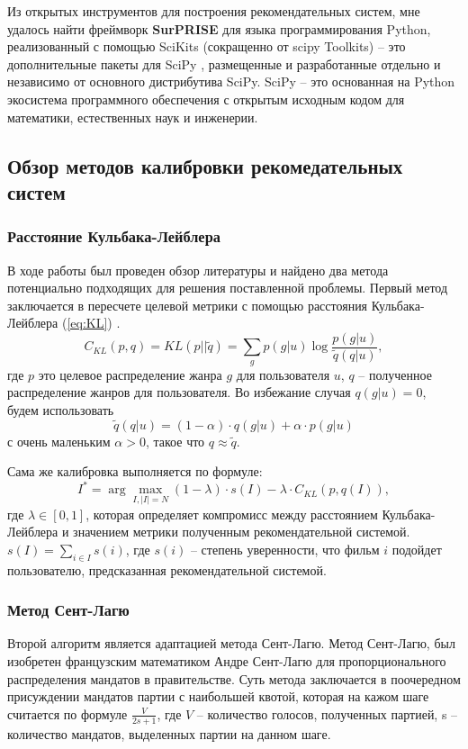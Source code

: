   Из открытых инструментов для построения рекомендательных систем, мне
  удалось найти фреймворк \textbf{SurPRISE} \cite{sur} для языка программирования Python, 
  реализованный с помощью SciKits \cite{SciKits} (сокращенно от scipy Toolkits) -- 
  это дополнительные пакеты для SciPy \cite{Scipy}, размещенные и разработанные 
  отдельно и независимо от основного дистрибутива SciPy. SciPy -- 
  это основанная на Python экосистема программного обеспечения с 
  открытым исходным кодом для математики, естественных наук и 
  инженерии.

\subsection{Обзор методов калибровки рекомедательных систем}
\subsubsection{Расстояние Кульбака-Лейблера}
В ходе работы был проведен обзор литературы и найдено два 
метода потенциально подходящих для решения поставленной проблемы. 
Первый метод заключается в пересчете целевой метрики с помощью 
расстояния Кульбака-Лейблера (\ref{eq:KL}) \cite{bib4}.
\begin{equation}
  C_{KL}(p,q) = KL(p||\tilde{q}) = \sum_g p(g|u)\log\frac{p(g|u)}{\tilde{q}(q|u)},
  \label{eq:KL}
\end{equation}
где ${p}$ это целевое распределение жанра ${g}$ для пользователя 
$u$, $q$ -- полученное распределение жанров для пользователя.
Во избежание случая $q(g|u)=0$, будем использовать 
\begin{equation}
  \tilde{q}(q|u) = (1-\alpha) \cdot q(g|u) + \alpha \cdot p(g|u)
\end{equation} с очень маленьким $\alpha>0$, такое что $q\approx\tilde{q}$.

Сама же калибровка выполняется по формуле: 
\begin{equation}
  \label{eq:Calibrated}
  I^*=\arg \max_{I, |I|=N} (1-\lambda) \cdot s(I) - \lambda \cdot C_{KL}(p,q(I)),
\end{equation} где $\lambda \in [0,1]$, которая определяет 
компромисс между расстоянием Кульбака-Лейблера и значением 
метрики полученным рекомендательной системой. $s(I)=\sum_{i\in I}s(i)$, 
где $s(i)$ -- степень уверенности, что фильм $i$ подойдет 
пользователю, предсказанная рекомендательной системой.
\subsubsection{Метод Сент-Лагю}
Второй алгоритм является адаптацией метода Сент-Лагю. \cite{bib5} 
Метод Сент-Лагю, был изобретен французским математиком Андре 
Сент-Лагю для пропорционального распределения мандатов в 
правительстве. Суть метода заключается в поочередном присуждении 
мандатов партии с наибольшей квотой, которая на кажом шаге 
считается по формуле $\frac{V}{2s+1}$, где $V$ -- количество 
голосов, полученных партией, s -- количество мандатов, 
выделенных партии на данном шаге.

